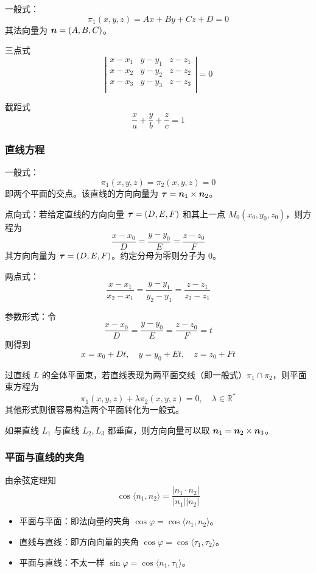 一般式：
\[ \pi_1(x, y, z) = Ax + By + Cz + D = 0 \]
其法向量为 $\boldsymbol{n} = (A, B, C)$。

三点式
\[ \left|\begin{matrix}
		x - x_1 & y - y_1 & z - z_1 \\
		x - x_2 & y - y_2 & z - z_2 \\
		x - x_3 & y - y_3 & z - z_3 \\
	\end{matrix} \right| = 0 \]

截距式
\[ \frac{x}{a} + \frac{y}{b} + \frac{z}{c} = 1 \]


\subsubsection*{直线方程}

一般式：
\[ \pi_1(x, y, z) = \pi_2(x, y, z) = 0 \]
即两个平面的交点。该直线的方向向量为 $\boldsymbol{\tau} = \boldsymbol{n}_1 \times \boldsymbol{n}_2$。

点向式：若给定直线的方向向量 $\boldsymbol{\tau} = (D, E, F)$ 和其上一点 $M_0(x_0, y_0, z_0)$，则方程为
\[ \frac{x - x_0}{D} = \frac{y - y_0}{E} = \frac{z - z_0}{F} \]
其方向向量为 $\boldsymbol{\tau} = (D, E, F)$。约定分母为零则分子为 $0$。

两点式：
\[ \frac{x - x_1}{x_2 - x_1} = \frac{y - y_1}{y_2 - y_1} = \frac{z - z_1}{z_2 - z_1} \]

参数形式：令
\[ \frac{x - x_0}{D} = \frac{y - y_0}{E} = \frac{z - z_0}{F} = t \]
则得到
\[ x = x_0 + Dt, \quad y = y_0 + Et, \quad z = z_0 + Ft \]

过直线 $L$ 的全体平面束，若直线表现为两平面交线（即一般式）$\pi_1 \cap \pi_2$，则平面束方程为
\[ \pi_1(x, y, z) + \lambda \pi_2(x, y, z) = 0, \quad \lambda \in \mathbb{R}^\ast \]
其他形式则很容易构造两个平面转化为一般式。

如果直线 $L_1$ 与直线 $L_2, L_3$ 都垂直，则方向向量可以取 $\boldsymbol{n}_1 = \boldsymbol{n}_2 \times \boldsymbol{n}_3$。

\subsubsection*{平面与直线的夹角}

由余弦定理知
\[ \cos \langle n_1, n_2 \rangle = \frac{|n_1 \cdot n_2|}{|n_1| |n_2|} \]
\begin{itemize}
	\item 平面与平面：即法向量的夹角 $\cos \varphi = \cos\langle n_1, n_2 \rangle$。
	\item 直线与直线：即方向向量的夹角 $\cos \varphi = \cos\langle \tau_1, \tau_2 \rangle$。
	\item 平面与直线：不太一样 $\sin \varphi = \cos\langle n_1, \tau_1 \rangle$。
\end{itemize}

